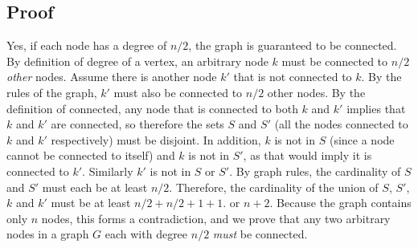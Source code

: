 \documentclass[titlepage]{article}
\numberwithin{equation}{subsection}
\begin{document}
\subsection{Proof}
Yes, if each node has a degree of $n/2$, the graph is guaranteed to be
connected. By definition of degree of a vertex, an arbitrary node $k$
must be connected to $n/2$ \textit{other} nodes. Assume there is another
node $k'$ that is not connected to $k$. By the rules of the graph, 
$k'$ must also be connected to $n/2$ other nodes. By the definition of
connected, any node that is connected to both $k$ and $k'$ implies that
$k$ and $k'$ are connected, so therefore the sets $S$ and $S'$ (all the
nodes connected to $k$ and $k'$ respectively) must be disjoint. In
addition, $k$ is not in $S$ (since a node cannot be connected to itself)
and $k$ is not in $S'$, as that would imply it is connected to $k'$.
Similarly $k'$ is not in $S$ or $S'$. By graph rules, the cardinality of 
$S$ and $S'$ must each be at least $n/2$. Therefore, the cardinality of
the union of $S$, $S'$, $k$ and $k'$ must be at least $n/2 + n/2 + 1 + 1$.
or $n + 2$. Because the graph contains only $n$ nodes, this forms a 
contradiction, and we prove that any two arbitrary nodes in a graph $G$
each with degree $n/2$ \textit{must} be connected.
\end{document}
